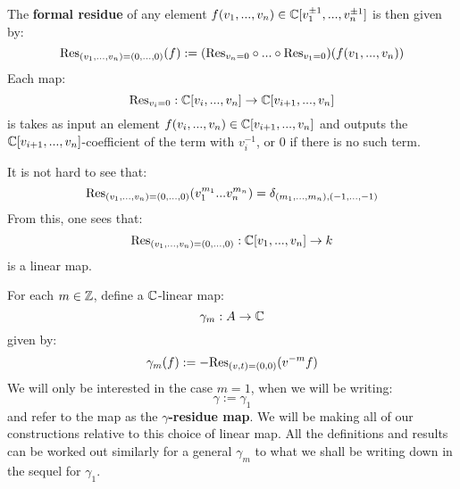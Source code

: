         \begin{definition} \label{def: formal_residues}
            The \textbf{formal residue} of any element $f(v_1, ..., v_n) \in \mathbb{C}[v_1^{\pm 1}, ..., v_n^{\pm 1}]$ is then given by:
                $$\mathrm{Res}_{(v_1, ..., v_n) = (0, ..., 0)}(f) := ( \mathrm{Res}_{v_n = 0} \circ ... \circ \mathrm{Res}_{v_1 = 0} )( f(v_1, ..., v_n) )$$
            Each map:
                $$\mathrm{Res}_{v_i = 0}: \mathbb{C}[v_i, ..., v_n] \to \mathbb{C}[v_{i + 1}, ..., v_n]$$
            is takes as input an element $f(v_i, ..., v_n) \in \mathbb{C}[v_{i + 1}, ..., v_n]$ and outputs the $\mathbb{C}[v_{i + 1}, ..., v_n]$-coefficient of the term with $v_i^{-1}$, or $0$ if there is no such term. 
        \end{definition}
        \begin{remark}
            It is not hard to see that:
                $$\mathrm{Res}_{(v_1, ..., v_n) = (0, ..., 0)}( v_1^{m_1} ... v_n^{m_n} ) = \delta_{(m_1, ..., m_n), (-1, ..., -1)}$$
            From this, one sees that:
                $$\mathrm{Res}_{(v_1, ..., v_n) = (0, ..., 0)}: \mathbb{C}[v_1, ..., v_n] \to k$$
            is a linear map.
        \end{remark}
    
        For each $m \in \mathbb{Z}$, define a $\mathbb{C}$-linear map:
            $$\gamma_m: A \to \mathbb{C}$$
        given by:
            $$\gamma_m(f) := -\mathrm{Res}_{(v, t) = (0, 0)}( v^{-m} f )$$
        We will only be interested in the case $m = 1$, when we will be writing:
            $$\gamma := \gamma_1$$
        and refer to the map as the \textbf{$\gamma$-residue map}. We will be making all of our constructions relative to this choice of linear map. All the definitions and results can be worked out similarly for a general $\gamma_m$ to what we shall be writing down in the sequel for $\gamma_1$.
    
